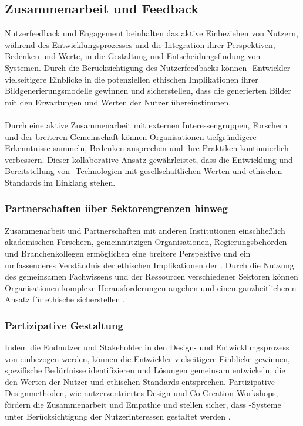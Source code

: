 \documentclass[hidelinks,12pt]{report}
\begin{document}
\subsection{Zusammenarbeit und Feedback}
Nutzerfeedback und Engagement beinhalten das aktive Einbeziehen von Nutzern, während des Entwicklungsprozesses und die Integration ihrer Perspektiven, Bedenken und Werte, in die Gestaltung und Entscheidungsfindung von -Systemen. Durch die Berücksichtigung des Nutzerfeedbacks können -Entwickler vielseitigere Einblicke in die potenziellen ethischen Implikationen ihrer Bildgenerierungsmodelle gewinnen und sicherstellen, dass die generierten Bilder mit den Erwartungen und Werten der Nutzer übereinstimmen.
\\\\
Durch eine aktive Zusammenarbeit mit externen Interessengruppen, Forschern und der breiteren Gemeinschaft können Organisationen tiefgründigere Erkenntnisse sammeln, Bedenken ansprechen und ihre Praktiken kontinuierlich verbessern. Dieser kollaborative Ansatz gewährleistet, dass die Entwicklung und Bereitstellung von  -Technologien mit gesellschaftlichen Werten und ethischen Standards im Einklang stehen.
\\
\subsubsection{Partnerschaften über Sektorengrenzen hinweg}
Zusammenarbeit und Partnerschaften mit anderen Institutionen einschließlich akademischen Forschern, gemeinnützigen Organisationen, Regierungsbehörden und Branchenkollegen ermöglichen eine breitere Perspektive und ein umfassenderes Verständnis der ethischen Implikationen der . Durch die Nutzung des gemeinsamen Fachwissens und der Ressourcen verschiedener Sektoren können Organisationen komplexe Herausforderungen angehen und einen ganzheitlicheren Ansatz für ethische  sicherstellen \cite{Vogel}.
\\
\subsubsection{Partizipative Gestaltung}
Indem die Endnutzer und Stakeholder in den Design- und Entwicklungsprozess von   einbezogen werden, können die Entwickler vielseitigere Einblicke gewinnen, spezifische Bedürfnisse identifizieren und Lösungen gemeinsam entwickeln, die den Werten der Nutzer und ethischen Standards entsprechen. Partizipative Designmethoden, wie nutzerzentriertes Design und Co-Creation-Workshops, fördern die Zusammenarbeit und Empathie und stellen sicher, dass -Systeme unter Berücksichtigung der Nutzerinteressen gestaltet werden \cite{Zytko}.
\\
\end{document}
